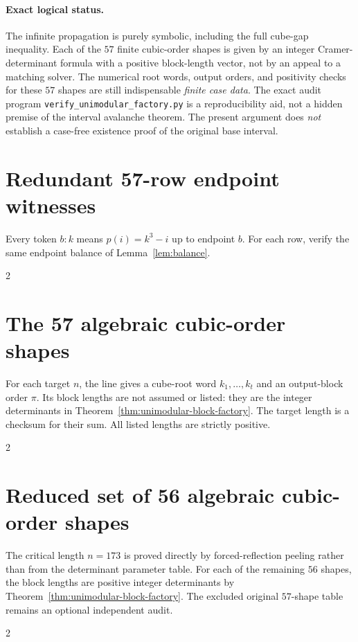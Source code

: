 \documentclass[10pt]{article}
\begin{document}
\paragraph{Exact logical status.}
The infinite propagation is purely symbolic,
including the full cube-gap inequality.
Each of the $57$ finite cubic-order shapes
is given by an integer Cramer-determinant
formula with a positive block-length vector,
not by an appeal to a matching solver.
The numerical root words, output orders,
and positivity checks for these $57$ shapes
are still indispensable \emph{finite case data}.
The exact audit program
\texttt{verify\_unimodular\_factory.py}
is a reproducibility aid, not a hidden
premise of the interval avalanche theorem.
The present argument does \emph{not}
establish a case-free existence proof
of the original base interval.

\clearpage
\appendix
\section{Redundant 57-row endpoint witnesses}
\label{app:table}
Every token $b:k$ means $p(i)=k^3-i$
up to endpoint $b$. For each row, verify
the same endpoint balance of
Lemma~\ref{lem:balance}.

\begin{multicols}{2}
\scriptsize\ttfamily
\setlength{\parindent}{0pt}
\setlength{\parskip}{2pt}

\end{multicols}


\clearpage
\section{The 57 algebraic cubic-order shapes}
\label{app:algebraic-shapes}
For each target $n$, the line gives a cube-root
word $k_1,\ldots,k_t$ and an output-block order
$\pi$. Its block lengths are not assumed or
listed: they are the integer determinants
in Theorem~\ref{thm:unimodular-block-factory}.
The target length is a checksum for their sum.
All listed lengths are strictly positive.
\begin{multicols}{2}
\scriptsize
\setlength{\parindent}{0pt}
\setlength{\parskip}{2pt}

\end{multicols}


\clearpage
\section{Reduced set of 56 algebraic cubic-order shapes}
\label{app:reduced-shapes}
The critical length $n=173$ is proved directly
by forced-reflection peeling rather than from
the determinant parameter table. For each of
the remaining $56$ shapes, the block lengths
are positive integer determinants by
Theorem~\ref{thm:unimodular-block-factory}.
The excluded original $57$-shape table
remains an optional independent audit.
\begin{multicols}{2}
\scriptsize
\setlength{\parindent}{0pt}
\setlength{\parskip}{2pt}

\end{multicols}
\end{document}

